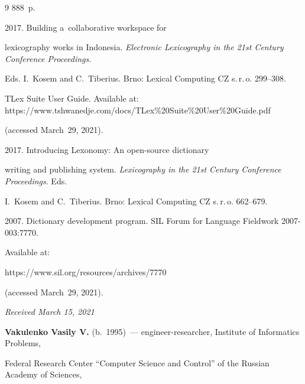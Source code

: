 {{\begin{thebibliography}{9}
888~p.


 2017. Building a~collaborative workspace for 

lexicography works in Indonesia. \textit{Electronic Lexicography in the 21st Century Conference Proceedings}. 

Eds. I.~Kosem and C.~Tiberius. Brno: Lexical Computing CZ s.\,r.\,o. 299--308.


TLex Suite User Guide. Available at: {\sf https://www.tshwanedje.com/docs/TLex\%20\linebreak Suite\%20User\%20Guide.pdf}

 (accessed March~29, 2021).


 2017. Introducing Lexonomy: An open-source dictionary 

writing and publishing system. \textit{Lexicography in the 21st Century Conference Proceedings}. Eds. 

I.~Kosem and C.~Tiberius. Brno: Lexical Computing CZ s.\,r.\,o. 662--679.


 2007. Dictionary development program. SIL Forum for Language Fieldwork 2007-003:7770.

Available at: {\sf 

https://www.sil.org/resources/archives/7770} (accessed March~29, 2021).



\end{thebibliography}

} }






\hfill{\small\textit{Received March 15, 2021}} 






\Contr



\noindent

\textbf{Vakulenko Vasily V.} (b.\ 1995)~--- engineer-researcher, Institute of Informatics Problems, 

Federal Research Center ``Computer Science and Control'' of the Russian Academy of Sciences,  

